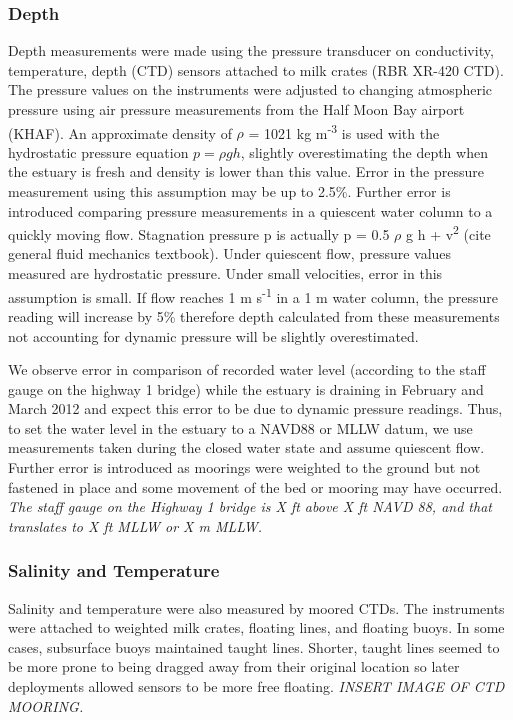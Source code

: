 \subsubsection{Depth} \label{sssec:depth}
Depth measurements were made using the pressure transducer on conductivity, temperature, depth (CTD) sensors
attached to milk crates (RBR XR-420 CTD). The pressure values on the instruments were adjusted to
changing atmospheric pressure using air pressure measurements from the
Half Moon Bay airport (KHAF). An approximate density of $\rho$ = 1021 kg
m\textsuperscript{-3} is used with the hydrostatic pressure equation ${p
= \rho g h}$, slightly overestimating the depth when the estuary is
fresh and density is lower than this value. Error in the pressure
measurement using this assumption may be up to 2.5\%. Further error is
introduced comparing pressure measurements in a quiescent water column
to a quickly moving flow. Stagnation pressure p is actually p = 0.5
$\rho$ g h +  v\textsuperscript{2} (cite general fluid mechanics
textbook). Under quiescent flow, pressure values measured are
hydrostatic pressure. Under small velocities, error in this assumption
is small. If flow reaches 1 m s\textsuperscript{-1} in a 1 m water
column, the pressure reading will increase by 5\% therefore depth
calculated from these measurements not accounting for dynamic pressure
will be slightly overestimated.

We observe error in comparison of recorded water level (according to the
staff gauge on the highway 1 bridge) while the estuary is draining in
February and March 2012 and expect this error to be due to dynamic
pressure readings. Thus, to set the water level in the estuary to a
NAVD88 or MLLW datum, we use measurements taken during the closed water
state and assume quiescent flow.  Further error is introduced as
moorings were weighted to the ground but not fastened in place and some
movement of the bed or mooring may have occurred. \emph{The staff gauge on the Highway 1 bridge is X ft above X ft NAVD 88, and that translates to X ft MLLW or X m MLLW.}

\subsubsection{Salinity and Temperature} \label{sssec:SandT}
Salinity and temperature were also measured by moored CTDs. The instruments were attached to weighted milk crates, floating lines, and floating buoys. In some cases, subsurface buoys maintained taught lines.  Shorter, taught lines seemed to be more prone to being dragged away from their original location so later deployments allowed sensors to be more free floating. \emph{INSERT IMAGE OF CTD MOORING.}

